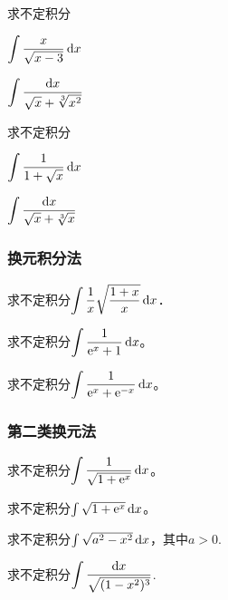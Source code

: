 \documentclass[14pt,notheorems,leqno,xcolor={rgb}]{beamer} %
\begin{document}
\begin{frame}
\begin{example}
求不定积分
\begin{enumlite}
  \item $\Int\dfrac{x}{\sqrt{x-3}}\d x$
  \item $\Int\dfrac{\d x}{\sqrt{x}+\sqrt[3]{x^2}}$
\end{enumlite}
\end{example}
\vpause
\begin{exercise}
求不定积分
\begin{enumlite}
  \item $\Int\dfrac{1}{1+\sqrt{x}}\d x$\pause
  \item $\Int\dfrac{\d x}{\sqrt{x}+\sqrt[3]{x}}$
\end{enumlite}
\end{exercise}
\end{frame}

\begin{frame}
\frametitle{换元积分法}
\begin{example}
求不定积分$\Int\dfrac1x\sqrt{\dfrac{1+x}{x}}\dx$．
\end{example}
\end{frame}

\begin{frame}
\begin{example}
求不定积分$\Int \dfrac{1}{\e^x+1}\d x$。
\end{example}
\vpause
\begin{exercise}
求不定积分$\Int\dfrac{1}{\e^x+\e^{-x}}\d x$。
\end{exercise}
\end{frame}

\begin{iframe}
\frametitle{第二类换元法}
\begin{example}
求不定积分$\Int \dfrac{1}{\sqrt{1+\e^x}}\d x$。
\end{example}
\vpause
\begin{exercise}
求不定积分$\int \sqrt{1+\mathrm{e}^x}\mathop{}\!\mathrm{d} x$。
\end{exercise}
\end{iframe}

\begin{frame}
\begin{example}
求不定积分$\int \sqrt{a^2-x^2}\mathop{}\!\mathrm{d} x$，其中$a>0$.
\end{example}
\vpause
\begin{exercise}
求不定积分$\Int\dfrac{\d x}{\sqrt{(1-x^2)^3}}$.
\end{exercise}
\end{frame}
\end{document}
